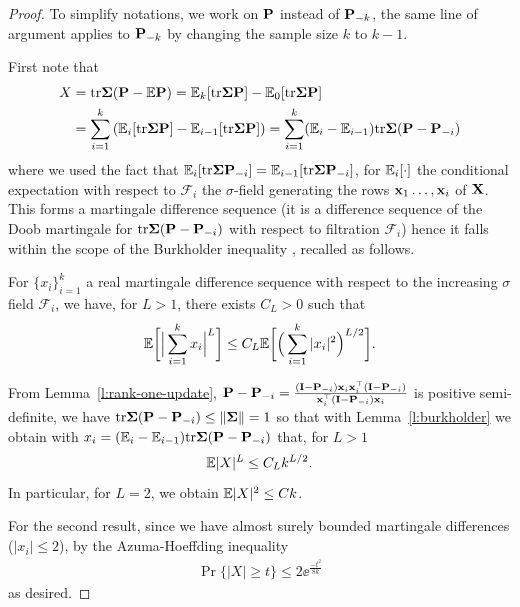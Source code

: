 \documentclass{article}
\begin{document}
\begin{proof}
To simplify notations, we work on $\P$ instead of $\P_{-k}$, the same line of argument applies to $\P_{-k}$ by changing the sample size $k$ to $k-1$.

First note that
\begin{align*}
  X
  &= \tr \Sigmab (\P - \E \P)
  = \E_k [\tr \Sigmab \P]  - \E_0[ \tr \Sigmab \P ]\\
  &= \sum_{i=1}^k \left( \E_i[\tr \Sigmab \P] - \E_{i-1}[\tr \Sigmab \P]\right)
  = \sum_{i=1}^k (\E_i - \E_{i-1}) \tr \Sigmab (\P - \P_{-i})
\end{align*}
where we used the fact that $\E_i [\tr \Sigmab \P_{-i}] = \E_{i-1} [\tr \Sigmab \P_{-i}]$, for $\E_i[\cdot]$ the conditional expectation with respect to $\mathcal F_i$ the $\sigma$-field generating the rows $\x_1 \ldots, \x_i$ of $\X$. This forms a martingale difference sequence (it is a difference sequence of
the Doob martingale for $\tr \Sigmab (\P - \P_{-i})$ with respect to filtration $\mathcal{F}_i$)
hence it falls within the scope of the Burkholder inequality \cite{burkholder1973distribution}, recalled as follows.

\begin{lemma}\label{l:burkholder}
For $\{ x_i \}_{i=1}^k$ a real martingale difference sequence with respect to the increasing $\sigma$ field $\mathcal F_i$, we have, for $L > 1$, there exists $C_L > 0$ such that
\[
  \E \bigg[
    \Big| \sum_{i=1}^k x_i \Big|^L
  \bigg]
  \le C_L \E \bigg[
    \Big( \sum_{i=1}^k |x_i|^2 \Big)^{L/2}
  \bigg].
\]
\end{lemma}

From Lemma~\ref{l:rank-one-update}, $\P - \P_{-i} = \frac{(\I - \P_{-i}) \x_i \x_i^\top (\I - \P_{-i}) }{ \x_i^\top (\I - \P_{-i}) \x_i}$ is positive semi-definite, we have $\tr \Sigmab (\P - \P_{-i}) \le \| \Sigmab \| = 1$ so that with Lemma~\ref{l:burkholder} we obtain with $x_i = (\E_i - \E_{i-1}) \tr \Sigmab (\P - \P_{-i})$ that, for $L > 1$
\[
  \E |X|^L \le C_L k^{L/2}.
\]
In particular, for $L=2$, we obtain $\E |X|^2 \le C k$.

For the second result, since we have almost surely bounded martingale differences
($\lvert x_i \rvert \leq 2$), by the Azuma-Hoeffding inequality
\begin{align*}
  \Pr\{
    \lvert X \rvert
    \geq t
  \}
  \leq 2 \ee^{\frac{-t^2}{8 k}}
\end{align*}
as desired.
\end{proof}
\end{document}
